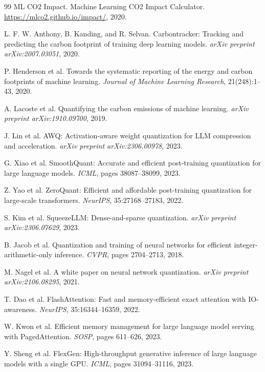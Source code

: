 \documentclass[11pt]{article}
\begin{document}
\begin{thebibliography}{99}
 ML CO2 Impact. Machine Learning CO2 Impact Calculator. \url{https://mlco2.github.io/impact/}, 2020.

 L. F. W. Anthony, B. Kanding, and R. Selvan. Carbontracker: Tracking and predicting the carbon footprint of training deep learning models. \textit{arXiv preprint arXiv:2007.03051}, 2020.

 P. Henderson et al. Towards the systematic reporting of the energy and carbon footprints of machine learning. \textit{Journal of Machine Learning Research}, 21(248):1--43, 2020.

 A. Lacoste et al. Quantifying the carbon emissions of machine learning. \textit{arXiv preprint arXiv:1910.09700}, 2019.

 J. Lin et al. AWQ: Activation-aware weight quantization for LLM compression and acceleration. \textit{arXiv preprint arXiv:2306.00978}, 2023.

 G. Xiao et al. SmoothQuant: Accurate and efficient post-training quantization for large language models. \textit{ICML}, pages 38087--38099, 2023.

 Z. Yao et al. ZeroQuant: Efficient and affordable post-training quantization for large-scale transformers. \textit{NeurIPS}, 35:27168--27183, 2022.

 S. Kim et al. SqueezeLLM: Dense-and-sparse quantization. \textit{arXiv preprint arXiv:2306.07629}, 2023.

 B. Jacob et al. Quantization and training of neural networks for efficient integer-arithmetic-only inference. \textit{CVPR}, pages 2704--2713, 2018.

 M. Nagel et al. A white paper on neural network quantization. \textit{arXiv preprint arXiv:2106.08295}, 2021.

 T. Dao et al. FlashAttention: Fast and memory-efficient exact attention with IO-awareness. \textit{NeurIPS}, 35:16344--16359, 2022.

 W. Kwon et al. Efficient memory management for large language model serving with PagedAttention. \textit{SOSP}, pages 611--626, 2023.

 Y. Sheng et al. FlexGen: High-throughput generative inference of large language models with a single GPU. \textit{ICML}, pages 31094--31116, 2023.


\end{thebibliography}
\end{document}
